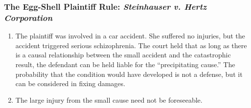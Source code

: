 \subsubsection{The Egg-Shell Plaintiff Rule: \emph{Steinhauser v. Hertz 
Corporation}}

\begin{enumerate}
    \item The plaintiff was involved in a car accident. She suffered no 
    injuries, but the accident triggered serious schizophrenia. The court held 
    that as long as there is a causal relationship between the small accident 
    and the catastrophic result, the defendant can be held liable for the 
    ``precipitating cause.'' The probability that the condition would have 
    developed is not a defense, but it can be considered in fixing damages.
    \item The large injury from the small cause need not be foreseeable.
\end{enumerate}
